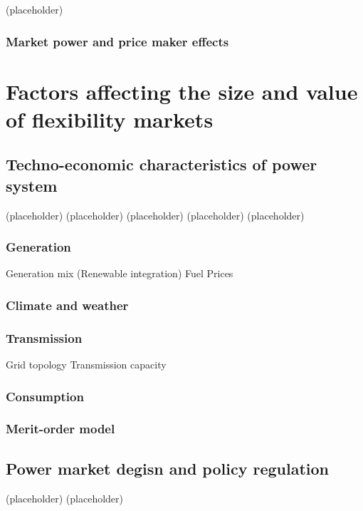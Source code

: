 (placeholder)
\newpage


\subsubsection{Market power and price maker effects}

\section{Factors affecting the size and value of flexibility markets}
\subsection{Techno-economic characteristics of power system}
(placeholder)
\newpage
(placeholder)
\newpage
(placeholder)
\newpage
(placeholder)
\newpage
(placeholder)
\newpage
\subsubsection{Generation}
Generation mix (Renewable integration)
Fuel Prices
\subsubsection{Climate and weather}

\subsubsection{Transmission}
Grid topology
Transmission capacity

\subsubsection{Consumption}

\subsubsection{Merit-order model}
\cite{Sensfuss2008}

\cite{SaenzdeMiera2008}
\cite{Tveten2013}
\cite{McConnell2013}
\cite{Gelabert2011}
\cite{Clo2015}
\cite{Woo2016}
\cite{Cludius2014}
\cite{He2013}
\cite{Mulder2013}

\subsection{Power market degisn and policy regulation}
(placeholder)
\newpage
(placeholder)
\newpage

